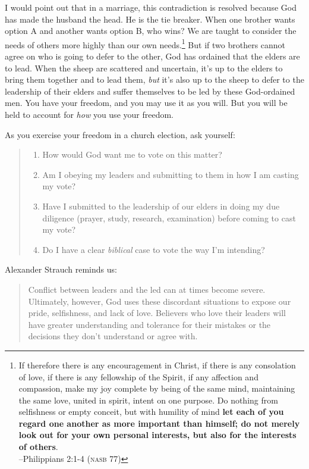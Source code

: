 I would point out that in a marriage, this contradiction is resolved because God has made the husband the head.  He is the tie breaker.  When one brother wants option A and another wants option B, who wins?  We are taught to consider the needs of others more highly than our own needs.\footnote{If therefore there is any encouragement in Christ, if there is any consolation of love, if there is any fellowship of the Spirit, if any affection and compassion, make my joy complete by being of the same mind, maintaining the same love, united in spirit, intent on one purpose. Do nothing from selfishness or empty conceit, but with humility of mind \textbf{let each of you regard one another as more important than himself; do not merely look out for your own personal interests, but also for the interests of others}.  \\ \hspace*{\fill} --Philippians 2:1-4 (\textsc{nasb 77})}  But if two brothers cannot agree on who is going to defer to the other, God has ordained that the elders are to lead.  When the sheep are scattered and uncertain, it's up to the elders to bring them together and to lead them, \textit{but} it's also up to the sheep to defer to the leadership of their elders and suffer themselves to be led by these God-ordained men.  You have your freedom, and you may use it as you will.  But you will be held to account for \textit{how} you use your freedom.  

As you exercise your freedom in a church election, ask yourself:
\begin{quote}
\begin{enumerate}
    \item How would God want me to vote on this matter?
    \item Am I obeying my leaders and submitting to them in how I am casting my vote?
    \item Have I submitted to the leadership of our elders in doing my due diligence (prayer, study, research, examination) before coming to cast my vote?
    \item Do I have a clear \textit{biblical} case to vote the way I'm intending?
\end{enumerate}
\end{quote}

\noindent
Alexander Strauch reminds us:
\begin{quote}
Conflict between leaders and the led can at times become severe.  Ultimately, however, God uses these discordant situations to expose our pride, selfishness, and lack of love.  Believers who love their leaders will have greater understanding and tolerance for their mistakes or the decisions they don't understand or agree with.
\end{quote}


